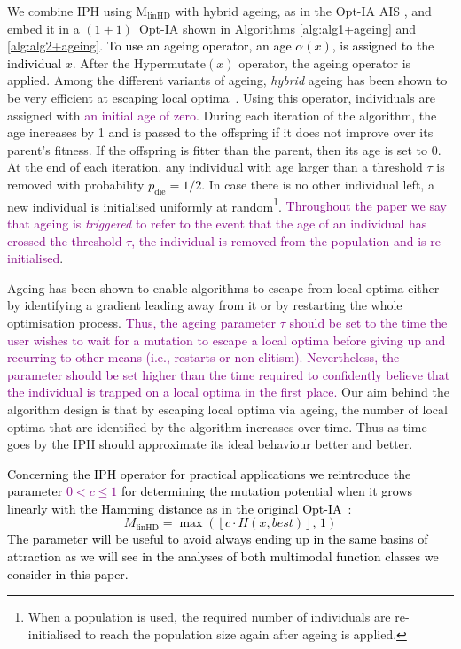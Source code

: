 \documentclass[lettersize,journal]{IEEEtran}
\newcommand{\new}[1]{\textcolor{black}{#1}}
\newcommand{\rerev}[1]{\textcolor{purple}{#1}}
\newcommand{\rev}[1]{\textcolor{black}{#1}}
\newcommand{\linHD}{M$_{\text{linHD}}$}
\newcommand{\IPHfcm}{IPH}
\begin{document}
 We combine \IPHfcm{} using {\linHD } with hybrid ageing, as in the Opt-IA AIS \cite{CutelloNicosiaPavoneTimmis2007}, and embed it in a $(1+1)$~Opt-IA shown in Algorithms \ref{alg:alg1+ageing} and \ref{alg:alg2+ageing}. \new{To use \rev{an} ageing operator, an age $\alpha(x)$, is assigned to the individual $x$.} After the Hypermutate$(x)$ operator, the ageing operator is applied.
 	Among the different variants of ageing, {\it hybrid} ageing has been shown to be very efficient at escaping local optima~\cite{OlivetoSudholt2014ageing,CorusOlivetoYazdani2019TCS,CorusOlivetoYazdaniFASTAIS2018,CorusOlivetoYazdaniPPSN2018Approx}. Using this operator,  individuals are assigned with \rerev{an initial age of zero}. During each iteration of the algorithm, the age  increases by 1 and is passed to the offspring if it does not improve over its parent's fitness. If the offspring is fitter than the parent, then its age is set to 0. At the end of each iteration, any individual with age larger than a threshold $\tau$ is removed with probability \rev{$p_{\text{die}}=1/2$}. In case there is no other individual left, a new individual is initialised uniformly at random\footnote{When a population is used, the required number of individuals are re-initialised to reach the population size again after ageing is applied.}. \rerev{Throughout the paper we say that ageing is {\it triggered} to refer to the event that the age of an individual has crossed the threshold $\tau$, the individual is removed from the population and is re-initialised}.
 
 Ageing has been shown to enable algorithms to escape from local optima either by identifying a gradient leading away from it or by restarting the whole optimisation process. 
  \rerev{Thus, the ageing parameter $\tau$ should be set to the time the user wishes to wait for a mutation to escape a local optima before giving up and recurring to other means (i.e., restarts or non-elitism). Nevertheless, the parameter should be set higher than the time required to confidently believe that the individual is trapped on a local optima in the first place.} 
 Our aim behind the algorithm design is that by escaping local optima via ageing, the number of local optima that are identified by the algorithm increases over time. Thus as time goes by the IPH should approximate its ideal behaviour better and better.
 
\textcolor{black}{Concerning the IPH operator for practical applications we  reintroduce the parameter \rerev{$0 < c \leq 1$} for determining the mutation potential when it grows linearly with the Hamming distance as in the original Opt-IA~\cite{JansenZarges2011}:}  
 \textcolor{black}{
 $$M_{\text{linHD}} = \max\!\left(\left\lfloor c \cdot H(x,\mathit{best}) \right\rfloor,\, 1 \right)$$
 }
\textcolor{black}{The parameter will be useful to avoid always ending up in the same basins of attraction as we will see in the analyses of both multimodal function classes we consider in this paper.} 
 
\end{document}
